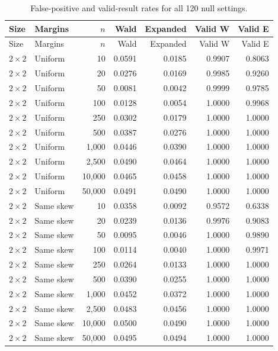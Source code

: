 \begin{longtable}{@{}llrrrrr@{}}
\caption{False-positive and valid-result rates for all 120 null settings.}\label{tab:all-main-null}\\
\toprule Size & Margins & \(n\) & Wald & Expanded & Valid W & Valid E\\\midrule\endfirsthead
\toprule Size & Margins & \(n\) & Wald & Expanded & Valid W & Valid E\\\midrule\endhead
\(2\times2\) & Uniform & 10 & 0.0591 & 0.0185 & 0.9907 & 0.8063\\
\(2\times2\) & Uniform & 20 & 0.0276 & 0.0169 & 0.9985 & 0.9260\\
\(2\times2\) & Uniform & 50 & 0.0081 & 0.0042 & 0.9999 & 0.9785\\
\(2\times2\) & Uniform & 100 & 0.0128 & 0.0054 & 1.0000 & 0.9968\\
\(2\times2\) & Uniform & 250 & 0.0302 & 0.0179 & 1.0000 & 1.0000\\
\(2\times2\) & Uniform & 500 & 0.0387 & 0.0276 & 1.0000 & 1.0000\\
\(2\times2\) & Uniform & 1,000 & 0.0446 & 0.0390 & 1.0000 & 1.0000\\
\(2\times2\) & Uniform & 2,500 & 0.0490 & 0.0464 & 1.0000 & 1.0000\\
\(2\times2\) & Uniform & 10,000 & 0.0465 & 0.0458 & 1.0000 & 1.0000\\
\(2\times2\) & Uniform & 50,000 & 0.0491 & 0.0490 & 1.0000 & 1.0000\\
\(2\times2\) & Same skew & 10 & 0.0358 & 0.0092 & 0.9572 & 0.6338\\
\(2\times2\) & Same skew & 20 & 0.0239 & 0.0136 & 0.9976 & 0.9083\\
\(2\times2\) & Same skew & 50 & 0.0095 & 0.0046 & 1.0000 & 0.9890\\
\(2\times2\) & Same skew & 100 & 0.0114 & 0.0040 & 1.0000 & 0.9971\\
\(2\times2\) & Same skew & 250 & 0.0264 & 0.0133 & 1.0000 & 1.0000\\
\(2\times2\) & Same skew & 500 & 0.0390 & 0.0255 & 1.0000 & 1.0000\\
\(2\times2\) & Same skew & 1,000 & 0.0452 & 0.0372 & 1.0000 & 1.0000\\
\(2\times2\) & Same skew & 2,500 & 0.0483 & 0.0456 & 1.0000 & 1.0000\\
\(2\times2\) & Same skew & 10,000 & 0.0500 & 0.0490 & 1.0000 & 1.0000\\
\(2\times2\) & Same skew & 50,000 & 0.0495 & 0.0494 & 1.0000 & 1.0000\\

\end{longtable}
